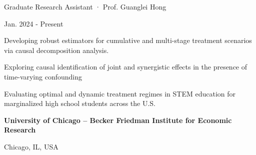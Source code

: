     \begin{minipage}{.75\linewidth} \begin{flushleft}
    		Graduate Research Assistant · Prof. Guanglei Hong
    	\end{flushleft} \end{minipage}
    \hfill 
    \begin{minipage}{.20\linewidth}\begin{flushright}
    	 Jan. 2024 - Present
    	\end{flushright}\end{minipage}
        \vspace{-5pt}
	\begin{description}[font=$\bullet$]
        \item{Developing robust estimators for cumulative and multi-stage treatment scenarios via causal decomposition analysis.}
        \vspace{-6pt}
        \item{Exploring causal identification of joint and synergistic effects in the presence of time-varying confounding}
        \vspace{-6pt}
        \item{Evaluating optimal and dynamic treatment regimes in STEM education for marginalized high school students across the U.S.}
\end{description}

    \begin{minipage}{.75\linewidth} \begin{flushleft}
    		\textbf{University of Chicago -- Becker Friedman Institute for Economic Research}
    	\end{flushleft} \end{minipage}
    \hfill 
    \begin{minipage}{.20\linewidth}\begin{flushright}
    	 Chicago, IL, USA
    	\end{flushright}\end{minipage}
     
